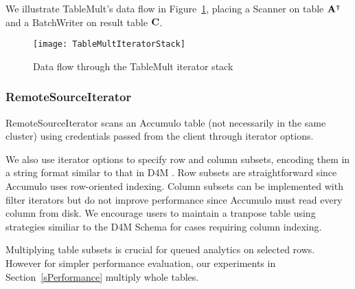 We illustrate TableMult's data flow in Figure~\ref{fIteratorStackSpGEMM},
placing a Scanner on table $\mathbf{A^{\intercal}}$
and a BatchWriter on result table $\mathbf{C}$.

\begin{figure}[htb]
\vspace{-3pt}
\centering
\texttt{[image: TableMultIteratorStack]}
\vspace{-8pt}
\caption{Data flow through the TableMult iterator stack}
\label{fIteratorStackSpGEMM}
\vspace{-9pt}
\end{figure}

\subsubsection{RemoteSourceIterator}
RemoteSourceIterator scans an Accumulo table
(not necessarily in the same cluster) %
using credentials passed from the client through iterator options.

We also use iterator options to specify row and column subsets, 
encoding them in a string format similar to that in D4M \cite{kepner2012dynamic}.
Row subsets are straightforward since Accumulo uses row-oriented indexing.
Column subsets can be implemented with filter iterators
but do not improve performance since Accumulo must read every column from disk.
We encourage users to maintain a tranpose table
using strategies similiar to the D4M Schema \cite{kepner2013d4m}
for cases requiring column indexing.

Multiplying table subsets is crucial for queued analytics on selected rows.
However for simpler performance evaluation, 
our experiments in Section~\ref{sPerformance} multiply whole tables.

